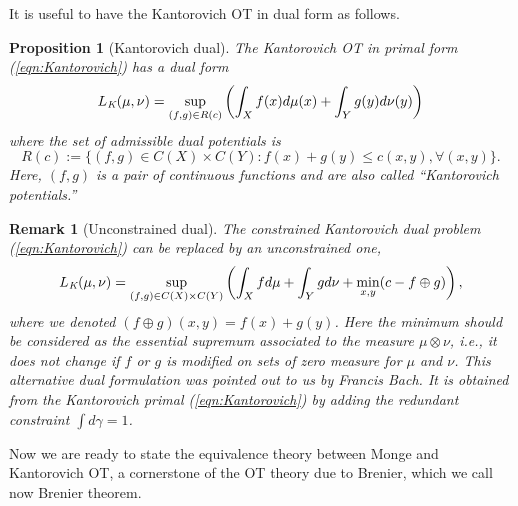 \documentclass[11pt]{book}
\newtheorem{proposition}[theorem]{Proposition}
\newtheorem{remark}[theorem]{Remark}
\begin{document}
It is useful to have the Kantorovich OT in dual form as follows.


\begin{proposition}[Kantorovich dual]
The Kantorovich OT in primal form (\ref{eqn:Kantorovich}) has a dual form
\begin{align}\label{eqn:Kantorovich_dual}
L_{\emph{K}}(\mu, \nu) = \sup_{(f,g) \in R(c)} \left( \int_X f(x) d\mu(x) + \int_Y g(y) d\nu(y) \right) 
\end{align}
where the set of admissible dual potentials is
\[
R(c) := \{(f,g) \in C(X) \times C(Y) : f(x) + g(y) \leq c(x,y), \forall (x,y)\}.
\]
Here, \((f,g)\) is a pair of continuous functions and are also called ``Kantorovich potentials.''
\end{proposition}


\begin{remark}[Unconstrained dual]
The constrained Kantorovich dual problem (\ref{eqn:Kantorovich}) can be replaced by an unconstrained one,
\begin{align}
L_{\emph{K}}(\mu, \nu)  = \sup_{(f,g) \in C(X) \times C(Y)} \left( \int_X f d\mu + \int_Y g d\nu + \min_{x,y} (c - f \oplus g) \right),
\end{align}
where we denoted \( (f \oplus g)(x,y) = f(x) + g(y) \). Here the minimum should be considered as the essential supremum associated to the measure \( \mu \otimes \nu \), i.e., it does not change if \( f \) or \( g \) is modified on sets of zero measure for \(\mu\) and \(\nu\). This alternative dual formulation was pointed out to us by Francis Bach. It is obtained from the Kantorovich primal (\ref{eqn:Kantorovich}) by adding the redundant constraint \( \int d\gamma = 1 \).
\end{remark}


Now we are ready to state the equivalence theory between Monge and Kantorovich OT, a cornerstone of the OT theory due to Brenier, which we call now Brenier theorem.
\end{document}
